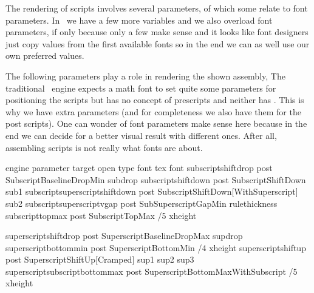 \startlinecorrection
{} {}
    {} {}
    {} {}
\stopcombination
\stoplinecorrection

The rendering of scripts involves several parameters, of which some relate to
font parameters. In \LUAMETATEX\ we have a few more variables and we also
overload font parameters, if only because only a few make sense and it looks like
font designers just copy values from the first available fonts so in the end we
can as well use our own preferred values.

The following parameters play a role in rendering the shown assembly, The
traditional \TEX\ engine expects a math font to set quite some parameters for
positioning the scripts but has no concept of prescripts and neither has
\OPENTYPE. This is why we have extra parameters (and for completeness we also
have them for the post scripts). One can wonder of font parameters make sense
here because in the end we can decide for a better visual result with different
ones. After all, assembling scripts is not really what fonts are about.

\starttabulate[|||||]
\FL
\BC engine parameter                                \BC target \BC open type font                      \BC tex font            \BC \NR
\TL
\NC                   subscriptshiftdrop            \NC post   \NC SubscriptBaselineDropMin            \NC subdrop             \NC \NR
\NC                   subscriptshiftdown            \NC post   \NC SubscriptShiftDown                  \NC sub1                \NC \NR
\NC                   subscriptsuperscriptshiftdown \NC post   \NC SubscriptShiftDown[WithSuperscript] \NC sub2                \NC \NR
\NC                   subscriptsuperscriptvgap      \NC post   \NC SubSuperscriptGapMin                   rulethickness   \NC \NR
\NC                   subscripttopmax               \NC post   \NC SubscriptTopMax                     /5 xheight         \NC \NR

\NC                   superscriptshiftdrop          \NC post   \NC SuperscriptBaselineDropMax          \NC supdrop             \NC \NR
\NC                   superscriptbottommin          \NC post   \NC SuperscriptBottomMin                /4 xheight         \NC \NR
\NC                   superscriptshiftup            \NC post   \NC SuperscriptShiftUp[Cramped]         \NC sup1 sup2 sup3      \NC \NR
\NC                   superscriptsubscriptbottommax \NC post   \NC SuperscriptBottomMaxWithSubscript   /5 xheight         \NC \NR

